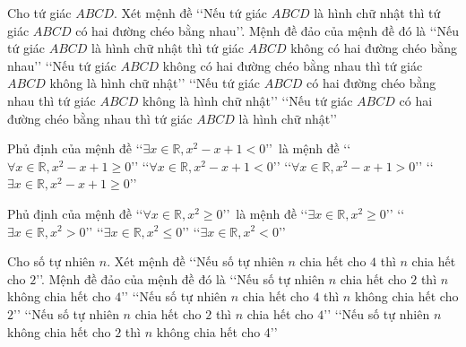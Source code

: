 \begin{ex}%
	Cho tứ giác $ABCD$. Xét mệnh đề \lq\lq Nếu tứ giác $ABCD$ là hình chữ nhật thì tứ giác $ABCD$ có hai đường chéo bằng nhau\rq\rq. Mệnh đề đảo của mệnh đề đó là
	\choice
	{\lq\lq Nếu tứ giác $ABCD$ là hình chữ nhật thì tứ giác $ABCD$ không có hai đường chéo bằng nhau\rq\rq}
	{\lq\lq Nếu tứ giác $ABCD$ không có hai đường chéo bằng nhau thì tứ giác $ABCD$ không là hình chữ nhật\rq\rq}
	{\lq\lq Nếu tứ giác $ABCD$ có hai đường chéo bằng nhau thì tứ giác $ABCD$ không là hình chữ nhật\rq\rq}
	{\True \lq\lq Nếu tứ giác $ABCD$ có hai đường chéo bằng nhau thì tứ giác $ABCD$ là hình chữ nhật\rq\rq}
\end{ex}
\begin{ex}%
	Phủ định của mệnh đề \lq\lq $\exists x \in \mathbb{R}, x^2-x+1<0$\rq\rq \ là mệnh đề
	\choice
	{\True \lq\lq $\forall x \in \mathbb{R}, x^2-x+1 \geq 0$\rq\rq}
	{\lq\lq $\forall x \in \mathbb{R}, x^2-x+1<0$\rq\rq}
	{\lq\lq $\forall x \in \mathbb{R}, x^2-x+1>0$\rq\rq}
	{\lq\lq $\exists x \in \mathbb{R}, x^2-x+1 \geq 0$\rq\rq}
\end{ex}
\begin{ex}%
	Phủ định của mệnh đề \lq\lq $\forall x \in \mathbb{R}, x^2 \geq 0$\rq\rq \ là mệnh đề
	\choice
	{\lq\lq $\exists x \in \mathbb{R}, x^2 \geq 0$\rq\rq}
	{\lq\lq $\exists x \in \mathbb{R}, x^2>0$\rq\rq}
	{\lq\lq $\exists x \in \mathbb{R}, x^2 \leq 0$\rq\rq}
	{\True \lq\lq $\exists x \in \mathbb{R}, x^2<0$\rq\rq}
\end{ex}
\begin{ex}%
	Cho số tự nhiên $n$. Xét mệnh đề \lq\lq Nếu số tự nhiên $n$ chia hết cho $4$ thì $n$ chia hết cho $2$\rq\rq. Mệnh đề đảo của mệnh đề đó là
	\choice
	{\lq\lq Nếu số tự nhiên $n$ chia hết cho $2$ thì $n$ không chia hết cho $4$\rq\rq}
	{\lq\lq Nếu số tự nhiên $n$ chia hết cho $4$ thì $n$ không chia hết cho $2$\rq\rq}
	{\True \lq\lq Nếu số tự nhiên $n$ chia hết cho $2$ thì $n$ chia hết cho $4$\rq\rq}
	{\lq\lq Nếu số tự nhiên $n$ không chia hết cho $2$ thì $n$ không chia hết cho 4\rq\rq}
\end{ex}

